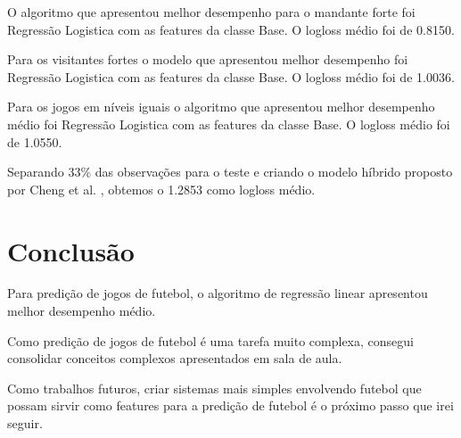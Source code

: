 \documentclass{article}
\begin{document}
O algoritmo que apresentou melhor desempenho para o mandante forte foi Regressão Logistica com as features da classe Base. O logloss médio foi de 0.8150.

Para os visitantes fortes o modelo que apresentou melhor desempenho foi  Regressão Logistica com as features da classe Base. O logloss médio foi de 1.0036.

Para os jogos em níveis iguais o algoritmo que apresentou melhor desempenho médio foi Regressão Logistica com as features da classe Base. O logloss médio foi de 1.0550.

Separando 33\% das observações para o teste e criando o modelo híbrido proposto por Cheng et al. \cite{cheng2003new}, obtemos o 1.2853 como logloss médio.

\section{Conclusão}

Para predição de jogos de futebol, o algoritmo de regressão linear apresentou melhor desempenho médio. 

Como predição de jogos de futebol é uma tarefa muito complexa, consegui consolidar conceitos complexos apresentados em sala de aula.

Como trabalhos futuros, criar sistemas mais simples envolvendo futebol que possam sirvir como features para a predição de futebol é o próximo passo que irei seguir.



\end{document}
